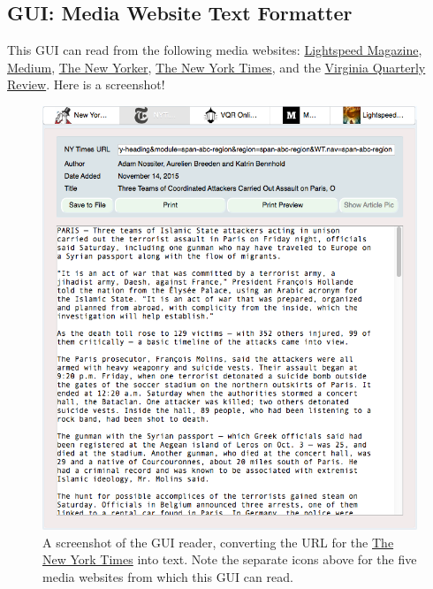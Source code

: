 \documentclass[]{article}
\begin{document}
\subsection{GUI: Media Website Text Formatter} \label{subsec:gui}
This GUI can read from the following media websites:
\href{http://www.lightspeedmagazine.com/}{Lightspeed Magazine},
\href{https://medium.com/}{Medium},
\href{http://www.newyorker.com/}{The New Yorker},
\href{http://www.nytimes.com/?WT.z_jog=1}{The New York Times}, and the
\href{http://www.vqronline.org/}{Virginia Quarterly Review}. Here is a
screenshot!
\begin{figure}[!ht]
\begin{minipage}[!ht]{0.65\linewidth}
 \includegraphics[width=\linewidth]{images/gui_screenshot.png}
\end{minipage} \hfill
\begin{minipage}[!ht]{0.34\linewidth}
 \caption{A screenshot of the GUI reader, converting the URL for
      the \href{http://www.nytimes.com}{The New York Times} into
      text. Note the separate icons above for the five media websites
      from which this GUI can read.} \label{fig:gui_screenshot}
\end{minipage}
\end{figure}
\end{document}
